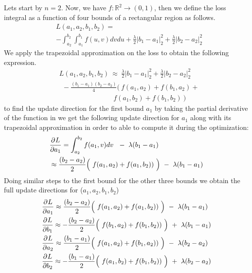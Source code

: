 Lets start by $n=2$. Now, we have $f: \mathbb{R}^{2} \rightarrow (0,1)$, then we define the loss integral as a function of four bounds of a rectangular region as follows.
\begin{equation}
\begin{aligned} 
&L(a_{1},a_{2},b_{1},b_{2}) = \\ 
&- \int_{a_{2}}^{b_{2}}\int_{a_{1}}^{b_{1}}f(u,v)dvdu + \frac{\lambda}{2} \left| b_1 -a_1 \right|_{2}^{2} + \frac{\lambda}{2} \left| b_2 -a_2 \right|_{2}^{2} 
\label{eq:naive-integration2}
\end{aligned}
\end{equation}
We apply the trapezoidal approximation on the loss to obtain the following expression. 
\begin{equation}
\begin{aligned} 
&L(a_{1},a_{2},b_{1},b_{2})~ \approx ~\frac{\lambda}{2} \left| b_1 -a_1 \right|_{2}^{2} + \frac{\lambda}{2} \left| b_2 -a_2 \right|_{2}^{2} \\ 
& ~~- \frac{(b_{1}-a_{1})(b_{2}-a_{2})}{4}(~f(a_{1},a_{2})+f(b_{1},a_{2})+\\ &~~~~~~~~~~~~~~~~~~~~~~~~~~~~~~~~~~~~f(a_{1},b_{2})+f(b_{1},b_{2})~) 
\label{eq:naive-integration3}
\end{aligned}
\end{equation}
to find the update direction for the first bound $a_1$ by taking the partial derivative of the function in \eqLabel{\ref{eq:naive-integration2}} we get the following update direction for $a_1$ along with its trapezoidal approximation in order to able to compute it during the optimization:
\begin{equation}
\begin{aligned} 
&\frac{\partial^{} L}{\partial a_{1}} =  \int_{a_{2}}^{b_{2}}f(a_1,v)dv ~~-~ \lambda (b_1-a_1)  \\  
&\approx \frac{(b_{2}-a_{2})}{2}\Big(~f(a_{1},a_{2}) + f(a_{1},b_{2}))~\Big) ~-~ \lambda (b_1-a_1)
\label{eq:update-naive-2-sup}
\end{aligned}
\end{equation}
Doing similar steps to the first bound for the other three bounds we obtain the full update directions for ($a_1 ,a_2 ,b_1 ,b_2$)
\begin{equation}
\begin{aligned} 
&\frac{\partial^{} L}{\partial a_{1}} \approx \frac{(b_{2}-a_{2})}{2}\Big(~f(a_{1},a_{2}) + f(a_{1},b_{2}))~\Big) ~-~ \lambda (b_1-a_1) \\
&\frac{\partial^{} L}{\partial b_{1}} \approx -\frac{(b_{2}-a_{2})}{2}\Big(~f(b_{1},a_{2}) + f(b_{1},b_{2}))~\Big) ~+~ \lambda (b_1-a_1)\\
&\frac{\partial^{} L}{\partial a_{2}} \approx \frac{(b_{1}-a_{1})}{2}\Big(~f(a_{1},a_{2}) + f(b_{1},a_{2}))~\Big) ~-~ \lambda (b_2-a_2)\\
&\frac{\partial^{} L}{\partial b_{2}} \approx -\frac{(b_{1}-a_{1})}{2}\Big(~f(a_{1},b_{2}) + f(b_{1},b_{2}))~\Big) ~+~ \lambda (b_2-a_2)
\label{eq:update-naive-3-sup}
\end{aligned}
\end{equation}
